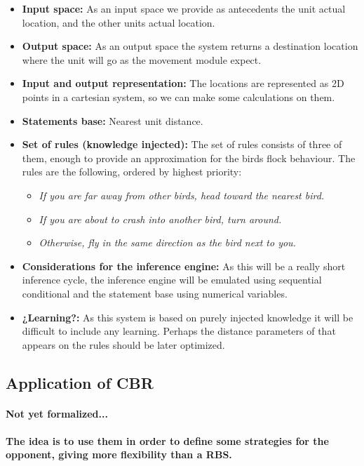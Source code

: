 \documentclass[a4paper,10pt]{article}
\newcommand{\p}[1]{\paragraph{\indent\textnormal{#1}}}
\begin{document}
      \begin{itemize}
      \item \textbf{Input space:} As an input space we provide as antecedents the unit actual location, and the other units actual location.
      \item \textbf{Output space:} As an output space the system returns a destination location where the unit will go as the movement module expect.
      \item \textbf{Input and output representation:} The locations are represented as 2D points in a cartesian system, so we can make some calculations on them.
      \item \textbf{Statements base:} Nearest unit distance.
      \item \textbf{Set of rules (knowledge injected):} The set of rules consists of three of them, enough to provide an approximation for the birds flock behaviour. The rules are the following, ordered by highest priority:
	  \begin{itemize}
	    \item \textit{If you are far away from other birds, head toward the nearest bird.}
	    \item \textit{If you are about to crash into another bird, turn around.}
	    \item \textit{Otherwise, fly in the same direction as the bird next to you.}

	  \end{itemize}
      \item \textbf{Considerations for the inference engine:} As this will be a really short inference cycle, the inference engine will be emulated using sequential conditional and the statement base using numerical variables.
      \item \textbf{¿Learning?:} As this system is based on purely injected knowledge it will be difficult to include any learning. Perhaps the distance parameters of that appears on the rules should be later optimized.
      \end{itemize}





  \subsection{Application of CBR}

    \p{Not yet formalized...}

    \p{The idea is to use them in order to define some strategies for the opponent, giving more flexibility than a RBS.}
\end{document}
